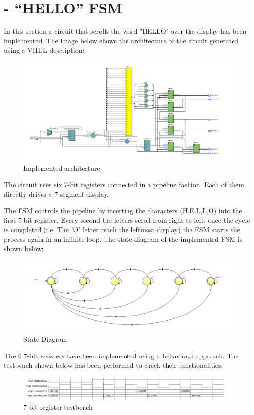 \documentclass[12pt]{article}
\begin{document}
\section{}
\newpage
\section{- “HELLO” FSM}
In this section a circuit that scrolls the word "HELLO" over the display has been implemented.
The image below shows the architecture of the circuit generated using a VHDL description:

\begin{figure}[h]
	\centering
	\includegraphics[scale = 0.47]{immagini/niki/rtl.PNG}
	\caption{Implemented architecture}
\end{figure}

The circuit uses six 7-bit registers connected in a pipeline fashion. Each of them directly drives a 7-segment display. 

The FSM controls the pipeline by inserting the characters (H,E,L,L,O) into the first 7-bit register.
Every second the letters scroll  from right to left, once the cycle is completed (i.e. The 'O' letter reach the leftmost display) the FSM starts the process again in an infinite loop.
The state diagram of the implemented FSM is shown below:
\begin{figure}[!h]
	\centering
	\includegraphics[scale = 0.45]{immagini/niki/statemachine.PNG}
	\caption{State Diagram}
\end{figure}
\newpage
The 6 7-bit resisters have been implemented using a behavioral approach. The testbench shown below has been performed to check their functionalities:
\begin{figure}[!h]
	\centering
	\includegraphics[scale = 0.55]{immagini/niki/reg.PNG}
	\caption{7-bit register testbench}
\end{figure}
\end{document}
